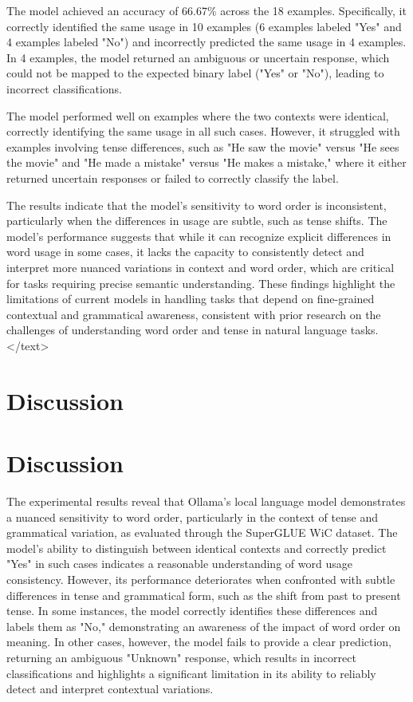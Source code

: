 \documentclass{article}
\begin{document}
The model achieved an accuracy of 66.67\% across the 18 examples. Specifically, it correctly identified the same usage in 10 examples (6 examples labeled "Yes" and 4 examples labeled "No") and incorrectly predicted the same usage in 4 examples. In 4 examples, the model returned an ambiguous or uncertain response, which could not be mapped to the expected binary label ("Yes" or "No"), leading to incorrect classifications.

The model performed well on examples where the two contexts were identical, correctly identifying the same usage in all such cases. However, it struggled with examples involving tense differences, such as "He saw the movie" versus "He sees the movie" and "He made a mistake" versus "He makes a mistake," where it either returned uncertain responses or failed to correctly classify the label.

The results indicate that the model's sensitivity to word order is inconsistent, particularly when the differences in usage are subtle, such as tense shifts. The model's performance suggests that while it can recognize explicit differences in word usage in some cases, it lacks the capacity to consistently detect and interpret more nuanced variations in context and word order, which are critical for tasks requiring precise semantic understanding. These findings highlight the limitations of current models in handling tasks that depend on fine-grained contextual and grammatical awareness, consistent with prior research on the challenges of understanding word order and tense in natural language tasks.
</text>
\section{Discussion}
\section*{Discussion}

The experimental results reveal that Ollama's local language model demonstrates a nuanced sensitivity to word order, particularly in the context of tense and grammatical variation, as evaluated through the SuperGLUE WiC dataset. The model's ability to distinguish between identical contexts and correctly predict "Yes" in such cases indicates a reasonable understanding of word usage consistency. However, its performance deteriorates when confronted with subtle differences in tense and grammatical form, such as the shift from past to present tense. In some instances, the model correctly identifies these differences and labels them as "No," demonstrating an awareness of the impact of word order on meaning. In other cases, however, the model fails to provide a clear prediction, returning an ambiguous "Unknown" response, which results in incorrect classifications and highlights a significant limitation in its ability to reliably detect and interpret contextual variations.
\end{document}
